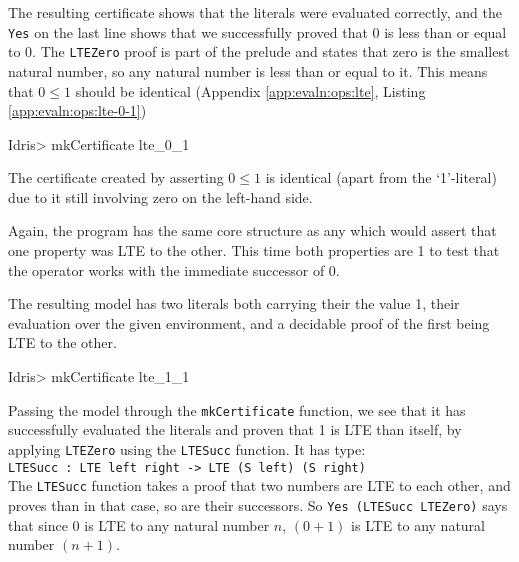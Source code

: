         \newpage
        
        
        The resulting certificate shows that the literals were evaluated correctly, and the \texttt{Yes} on the last line shows that we successfully proved that 0 is less than or equal to 0. The \texttt{LTEZero} proof is part of the \Idris prelude and states that zero is the smallest natural number, so any natural number is less than or equal to it. This means that $0 \leq 1$ should be identical (Appendix \ref{app:evaln:ops:lte}, Listing \ref{app:evaln:ops:lte-0-1})
        
        \begin{code}
Idris> mkCertificate lte_0_1
        \end{code}
        
        The certificate created by asserting $0 \leq 1$ is identical (apart from the `1'-literal) due to it still involving zero on the left-hand side.
        
        
        
        Again, the program has the same core structure as any which would assert that one property was LTE to the other. This time both properties are 1 to test that the operator works with the immediate successor of 0.
        
        \newpage
        
        
        The resulting \Idris model has two literals both carrying their the value 1, their evaluation over the given environment, and a decidable proof of the first being LTE to the other.
        
        \begin{code}
Idris> mkCertificate lte_1_1
        \end{code}
        
        Passing the model through the \texttt{mkCertificate} function, we see that it has successfully evaluated the literals and proven that 1 is LTE than itself, by applying \texttt{LTEZero} using the \texttt{LTESucc} function. It has type:\\
        \texttt{LTESucc : LTE left right -> LTE (S left) (S right)}\\
        The \texttt{LTESucc} function takes a proof that two numbers are LTE to each other, and proves than in that case, so are their successors. So \texttt{Yes (LTESucc LTEZero)} says that since 0 is LTE to any natural number $n$, $(0 + 1)$ is LTE to any natural number $(n + 1)$.
        
